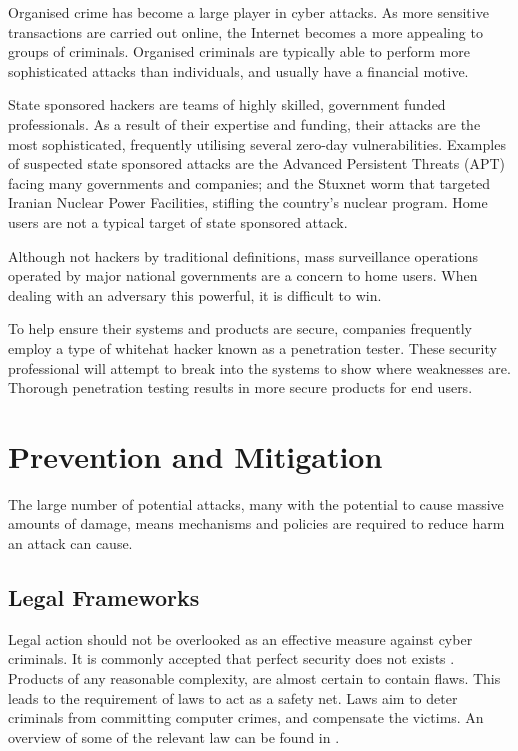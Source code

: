 \documentclass[10pt,journal,compsoc]{IEEEtran}
\begin{document}
Organised crime has become a large player in cyber attacks. As more sensitive
transactions are carried out online, the Internet becomes a more appealing to
groups of criminals. Organised criminals are typically able to perform more
sophisticated attacks than individuals, and usually have a financial motive. 

State sponsored hackers are teams of highly skilled, government funded
professionals. As a result of their expertise and funding, their attacks are
the most sophisticated, frequently utilising several zero-day vulnerabilities.
Examples of suspected state sponsored attacks are the Advanced Persistent
Threats (APT) facing many governments and companies; and the Stuxnet worm
that targeted Iranian Nuclear Power Facilities, stifling the country's nuclear
program. Home users are not a typical target of state sponsored attack. 

Although not hackers by traditional definitions, mass surveillance operations
operated by major national governments are a concern to home users. When
dealing with an adversary this powerful, it is difficult to win.  

To help ensure their systems and products are secure, companies frequently
employ a type of whitehat hacker known as a penetration tester. These security
professional will attempt to break into the systems to show where weaknesses
are. Thorough penetration testing results in more secure products for end
users.

\section{Prevention and Mitigation}
The large number of potential attacks, many with the potential to cause massive
amounts of damage, means mechanisms and policies are required to reduce harm an
attack can cause. 

\subsection{Legal Frameworks}
Legal action should not be overlooked as an effective measure against cyber
criminals. It is commonly accepted that perfect security does not exists
\cite{ThereMustBeA}. Products of any reasonable complexity, are almost certain
to contain flaws. This leads to the requirement of laws to act as a safety net.
Laws aim to deter criminals from committing computer crimes, and compensate the
victims. An overview of some of the relevant law can be found in
\cite{Weber2010}. 
\end{document}
